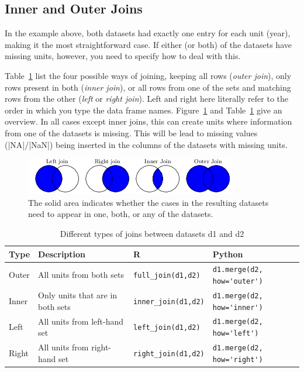 \subsection{Inner and Outer Joins}

In the example above, both datasets had exactly one entry for each unit (year), making it the most straightforward case.
If either (or both) of the datasets have missing units, however, you need to specify how to deal with this.

Table~\ref{tab:joins} list the four possible ways of joining, keeping all rows (\emph{outer join}), only rows present in both (\emph{inner join}), or all rows from one of the sets and matching rows from the other (\emph{left} or \emph{right join}). Left and right here literally refer to the order in which you type the data frame names. Figure~\ref{fig:joinvenn} and Table~\ref{tab:joins} give an overview.
In all cases except inner joins, this can create units where information from one of the datasets is missing.
This will be lead to missing values (|NA|/|NaN|) being inserted in the columns of the datasets with missing units.

\begin{figure}
    \centering
    \includegraphics{figures/ch07_figjoins.png}
    \caption{The solid area indicates whether the cases in the resulting datasets need to appear in one, both, or any of the datasets.}
    \label{fig:joinvenn}
\end{figure}

\begin{table}
  \caption{\label{tab:joins}Different types of joins between datasets d1 and d2}{
  \begin{tabularx}{\linewidth}{lXll}
    \toprule
    Type &  Description  & R & Python \\
    \midrule
    Outer &  All units from both sets & \verb|full_join(d1,d2)| & \verb|d1.merge(d2, how='outer')| \\
    Inner & Only units that are in both sets & \verb|inner_join(d1,d2)| & \verb|d1.merge(d2, how='inner')| \\
    Left & All units from left-hand set & \verb|left_join(d1,d2)| & \verb|d1.merge(d2, how='left')| \\
    Right & All units from right-hand set & \verb|right_join(d1,d2)| & \verb|d1.merge(d2, how='right')| \\
    \bottomrule
  \end{tabularx}}{}
\end{table}


